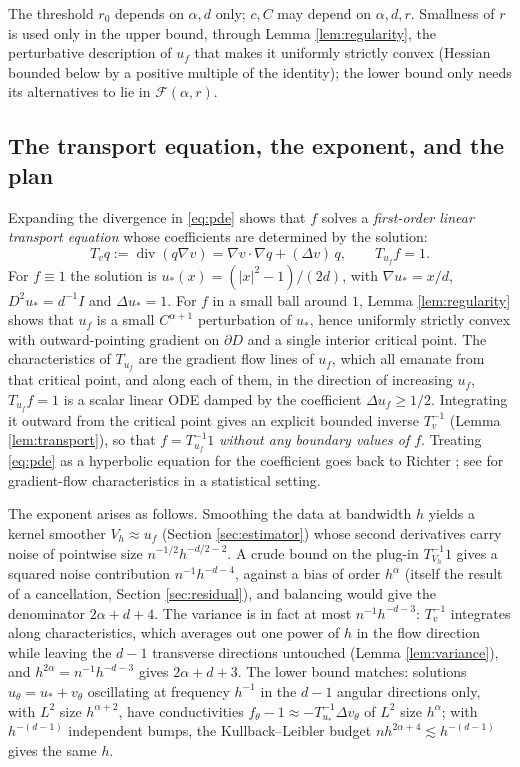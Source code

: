 \documentclass[11pt]{article}
\numberwithin{equation}{section}
\newcommand{\diver}{\operatorname{div}}
\begin{document}
The threshold $r_0$ depends on $\alpha,d$ only; $c,C$ may depend on
$\alpha,d,r$. Smallness of $r$ is used only in the
upper bound, through Lemma \ref{lem:regularity}, the perturbative
description of $u_f$ that makes it uniformly strictly convex (Hessian
bounded below by a positive multiple of the identity); the lower bound
only needs its alternatives to lie in $\mathcal F(\alpha,r)$.

\subsection{The transport equation, the exponent, and the plan}\label{sec:heuristic}

Expanding the divergence in \eqref{eq:pde} shows that $f$ solves a
\emph{first-order linear transport equation} whose coefficients are
determined by the solution:
\begin{equation}\label{eq:transportdef}
 T_vq:=\diver(q\nabla v)=\nabla v\cdot\nabla q+(\Delta v)\,q,
 \qquad T_{u_f}f=1 .
\end{equation}
For $f\equiv1$ the solution is $u_*(x)=(|x|^2-1)/(2d)$, with
$\nabla u_*=x/d$, $D^2u_*=d^{-1}I$ and $\Delta u_*=1$. For $f$ in a
small ball around $1$, Lemma \ref{lem:regularity} shows that $u_f$ is
a small $C^{\alpha+1}$ perturbation of $u_*$, hence uniformly strictly
convex with outward-pointing gradient on $\partial D$ and a single
interior critical point. The characteristics of $T_{u_f}$ are the
gradient flow lines of $u_f$, which all emanate from that critical
point, and along each of them, in the direction of increasing $u_f$,
$T_{u_f}f=1$ is a scalar linear ODE damped by the coefficient
$\Delta u_f\ge1/2$. Integrating it outward from the critical point
gives an explicit bounded inverse $T_v^{-1}$ (Lemma
\ref{lem:transport}), so that $f=T_{u_f}^{-1}1$ \emph{without any
boundary values of $f$}. Treating \eqref{eq:pde} as a hyperbolic
equation for the coefficient goes back to Richter \cite{Richter}; see
\cite{KSV} for gradient-flow characteristics in a statistical setting.

The exponent arises as follows. Smoothing the data at bandwidth $h$
yields a kernel smoother $V_h\approx u_f$ (Section
\ref{sec:estimator}) whose second derivatives carry noise of
pointwise size $n^{-1/2}h^{-d/2-2}$. A crude bound on the
plug-in $T_{V_h}^{-1}1$ gives a squared noise contribution
$n^{-1}h^{-d-4}$, against a bias of order $h^\alpha$ (itself the result
of a cancellation, Section \ref{sec:residual}), and balancing would
give the denominator $2\alpha+d+4$. The variance is in fact at most
$n^{-1}h^{-d-3}$: $T_v^{-1}$ integrates along characteristics, which
averages out one power of $h$ in the flow direction while leaving the
$d-1$ transverse directions untouched (Lemma \ref{lem:variance}), and
$h^{2\alpha}=n^{-1}h^{-d-3}$ gives $2\alpha+d+3$. The lower bound
matches: solutions $u_\theta=u_*+v_\theta$ oscillating at frequency
$h^{-1}$ in the $d-1$ angular directions only, with $L^2$ size
$h^{\alpha+2}$, have conductivities
$f_\theta-1\approx-T_{u_*}^{-1}\Delta v_\theta$ of $L^2$ size
$h^\alpha$; with $h^{-(d-1)}$ independent bumps, the Kullback--Leibler
budget $nh^{2\alpha+4}\lesssim h^{-(d-1)}$ gives the same $h$.
\end{document}
